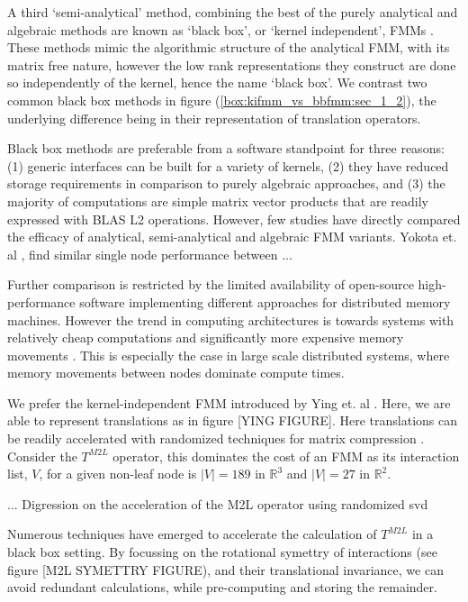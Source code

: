 A third `semi-analytical' method, combining the best of the purely analytical and algebraic methods are known as `black box', or `kernel independent', \gls{FMM}s \cite{Ying:2004:JCP,fong2009black,martinsson2007accelerated}. These methods mimic the algorithmic structure of the analytical FMM, with its matrix free nature, however the low rank representations they construct are done so independently of the kernel, hence the name `black box'. We contrast two common black box methods in figure (\ref{box:kifmm_vs_bbfmm:sec_1_2}), the underlying difference being in their representation of translation operators.

Black box methods are preferable from a software standpoint for three reasons: (1) generic interfaces can be built for a variety of kernels, (2) they have reduced storage requirements in comparison to purely algebraic approaches, and (3) the majority of computations are simple matrix vector products that are readily expressed with BLAS L2 operations. However, few studies have directly compared the efficacy of analytical, semi-analytical and algebraic FMM variants. Yokota et. al \cite{yokota2015fast}, find similar single node performance between ...

Further comparison is restricted by the limited availability of open-source high-performance software implementing different approaches for distributed memory machines. However the trend in computing architectures is towards systems with relatively cheap computations and significantly more expensive memory movements \cite{dongarra2017extreme}. This is especially the case in large scale distributed systems, where memory movements between nodes dominate compute times.

We prefer the kernel-independent FMM introduced by Ying et. al \cite{Ying:2004:JCP}. Here, we are able to represent translations as in figure [YING FIGURE]. Here translations can be readily accelerated with randomized techniques for matrix compression \cite{halko2011finding}. Consider the $T^{M2L}$ operator, this dominates the cost of an FMM as its interaction list, $V$,  for a given non-leaf node is $|V| = 189$ in $\mathbb{R}^3$ and $|V|=27$ in $\mathbb{R}^2$.

... Digression on the acceleration of the M2L operator using randomized svd

Numerous techniques have emerged to accelerate the calculation of $T^{M2L}$ in a black box setting. By focussing on the rotational symettry of interactions (see figure [M2L SYMETTRY FIGURE), and their translational invariance, we can avoid redundant calculations, while pre-computing and storing the remainder.

